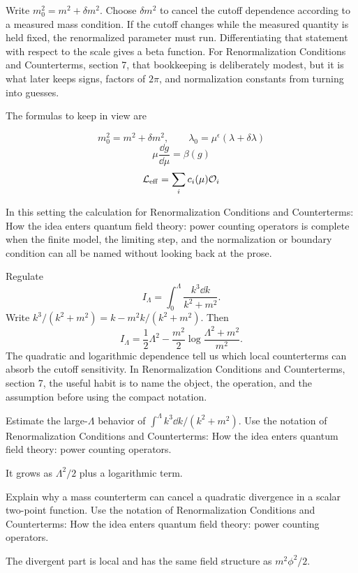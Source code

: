 Write \(m_0^2=m^2+\delta m^2\).  Choose \(\delta m^2\) to cancel the cutoff dependence according to a measured mass condition.  If the cutoff changes while the measured quantity is held fixed, the renormalized parameter must run.  Differentiating that statement with respect to the scale gives a beta function.  For Renormalization Conditions and Counterterms, section 7, that bookkeeping is deliberately modest, but it is what later keeps signs, factors of \(2\pi\), and normalization constants from turning into guesses.

The formulas to keep in view are

\[
  m_0^2=m^2+\delta m^2,\qquad \lambda_0=\mu^\epsilon(\lambda+\delta\lambda)
\]
\[
  \mu\frac{\dd g}{\dd\mu}=\beta(g)
\]
\[
  \mathcal L_{\mathrm{eff}}=\sum_i c_i(\mu)\mathcal O_i
\]

In this setting the calculation for Renormalization Conditions and Counterterms: How the idea enters quantum field theory: power counting operators is complete when the finite model, the limiting step, and the normalization or boundary condition can all be named without looking back at the prose.




\begin{example}
Regulate
\[
  I_\Lambda=\int_0^\Lambda\frac{k^3\dd k}{k^2+m^2}.
\]
Write \(k^3/(k^2+m^2)=k-m^2k/(k^2+m^2)\).  Then
\[
  I_\Lambda=\frac12\Lambda^2-\frac{m^2}{2}\log\frac{\Lambda^2+m^2}{m^2}.
\]
The quadratic and logarithmic dependence tell us which local counterterms can absorb the cutoff sensitivity.  In Renormalization Conditions and Counterterms, section 7, the useful habit is to name the object, the operation, and the assumption before using the compact notation.
\end{example}



\begin{exercise}
Estimate the large-\(\Lambda\) behavior of \(\int^\Lambda k^3\dd k/(k^2+m^2)\).  Use the notation of Renormalization Conditions and Counterterms: How the idea enters quantum field theory: power counting operators.
\begin{answer}
It grows as \(\Lambda^2/2\) plus a logarithmic term.
\end{answer}
\end{exercise}

\begin{exercise}
Explain why a mass counterterm can cancel a quadratic divergence in a scalar two-point function.  Use the notation of Renormalization Conditions and Counterterms: How the idea enters quantum field theory: power counting operators.
\begin{answer}
The divergent part is local and has the same field structure as \(m^2\phi^2/2\).
\end{answer}
\end{exercise}



